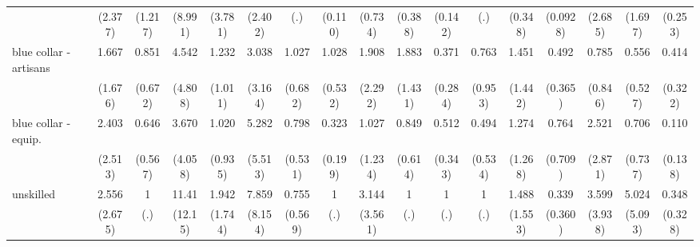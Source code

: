 {\begin{tabular}{l*{16}{c}}
                    &     (2.377)         &     (1.217)         &     (8.991)         &     (3.781)         &     (2.402)         &         (.)         &     (0.110)         &     (0.734)         &     (0.388)         &     (0.142)         &         (.)         &     (0.348)         &    (0.0928)         &     (2.685)         &     (1.697)         &     (0.253)         \\
[1em]
blue collar - artisans&       1.667         &       0.851         &       4.542         &       1.232         &       3.038         &       1.027         &       1.028         &       1.908         &       1.883         &       0.371         &       0.763         &       1.451         &       0.492         &       0.785         &       0.556         &       0.414         \\
                    &     (1.676)         &     (0.672)         &     (4.808)         &     (1.011)         &     (3.164)         &     (0.682)         &     (0.532)         &     (2.292)         &     (1.431)         &     (0.284)         &     (0.953)         &     (1.442)         &     (0.365)         &     (0.846)         &     (0.527)         &     (0.322)         \\
[1em]
blue collar - equip.&       2.403         &       0.646         &       3.670         &       1.020         &       5.282         &       0.798         &       0.323         &       1.027         &       0.849         &       0.512         &       0.494         &       1.274         &       0.764         &       2.521         &       0.706         &       0.110         \\
                    &     (2.513)         &     (0.567)         &     (4.058)         &     (0.935)         &     (5.513)         &     (0.531)         &     (0.199)         &     (1.234)         &     (0.614)         &     (0.343)         &     (0.534)         &     (1.268)         &     (0.709)         &     (2.871)         &     (0.737)         &     (0.138)         \\
[1em]
unskilled           &       2.556         &           1         &       11.41\sym{*}  &       1.942         &       7.859\sym{*}  &       0.755         &           1         &       3.144         &           1         &           1         &           1         &       1.488         &       0.339         &       3.599         &       5.024         &       0.348         \\
                    &     (2.675)         &         (.)         &     (12.15)         &     (1.744)         &     (8.154)         &     (0.569)         &         (.)         &     (3.561)         &         (.)         &         (.)         &         (.)         &     (1.553)         &     (0.360)         &     (3.938)         &     (5.093)         &     (0.328)         \\

\end{tabular}}
